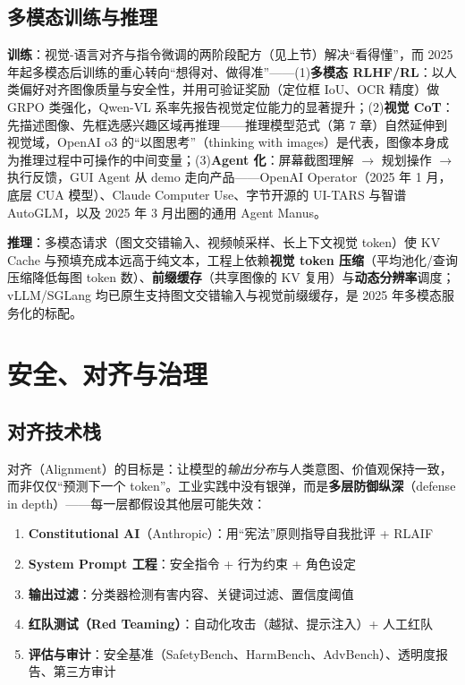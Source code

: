 \documentclass[12pt,a4paper]{article}
\begin{document}
\subsection{多模态训练与推理}

\textbf{训练}：视觉-语言对齐与指令微调的两阶段配方（见上节）解决“看得懂”，而 2025 年起多模态后训练的重心转向“想得对、做得准”——(1)\textbf{多模态 RLHF/RL}：以人类偏好对齐图像质量与安全性，并用可验证奖励（定位框 IoU、OCR 精度）做 GRPO 类强化，Qwen-VL 系率先报告视觉定位能力的显著提升；(2)\textbf{视觉 CoT}：先描述图像、先框选感兴趣区域再推理——推理模型范式（第 7 章）自然延伸到视觉域，OpenAI o3 的“以图思考”（thinking with images）是代表，图像本身成为推理过程中可操作的中间变量；(3)\textbf{Agent 化}：屏幕截图理解 $\to$ 规划操作 $\to$ 执行反馈，GUI Agent 从 demo 走向产品——OpenAI Operator（2025 年 1 月，底层 CUA 模型）、Claude Computer Use、字节开源的 UI-TARS 与智谱 AutoGLM，以及 2025 年 3 月出圈的通用 Agent Manus。

\textbf{推理}：多模态请求（图文交错输入、视频帧采样、长上下文视觉 token）使 KV Cache 与预填充成本远高于纯文本，工程上依赖\textbf{视觉 token 压缩}（平均池化/查询压缩降低每图 token 数）、\textbf{前缀缓存}（共享图像的 KV 复用）与\textbf{动态分辨率}调度；vLLM/SGLang 均已原生支持图文交错输入与视觉前缀缓存，是 2025 年多模态服务化的标配。

\section{安全、对齐与治理}

\subsection{对齐技术栈}

对齐（Alignment）的目标是：让模型的\emph{输出分布}与人类意图、价值观保持一致，而非仅仅“预测下一个 token”。工业实践中没有银弹，而是\textbf{多层防御纵深}（defense in depth）——每一层都假设其他层可能失效：

\begin{enumerate}
  \item \textbf{Constitutional AI}（Anthropic）：用“宪法”原则指导自我批评 + RLAIF
  \item \textbf{System Prompt 工程}：安全指令 + 行为约束 + 角色设定
  \item \textbf{输出过滤}：分类器检测有害内容、关键词过滤、置信度阈值
  \item \textbf{红队测试（Red Teaming）}：自动化攻击（越狱、提示注入）+ 人工红队
  \item \textbf{评估与审计}：安全基准（SafetyBench、HarmBench、AdvBench）、透明度报告、第三方审计
\end{enumerate}
\end{document}
